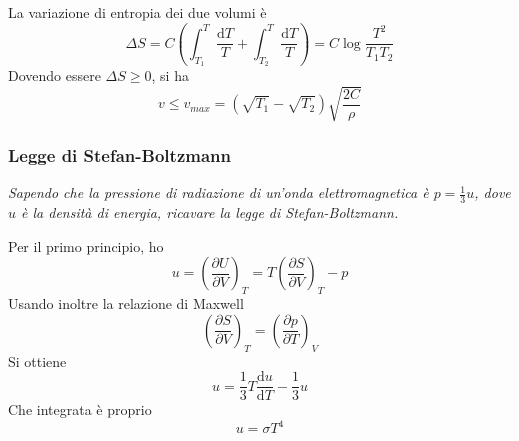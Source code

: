 \documentclass[a4paper,11pt]{article}
\begin{document}
La variazione di entropia dei due volumi è
\[\Delta S=C\left(\int_{T_1}^{T}\frac{\mathrm{d}T}{T}+\int_{T_2}^{T}\frac{\mathrm{d}T}{T}\right)=C\log\frac{T^2}{T_1T_2}\]
Dovendo essere $\Delta S\geq0$, si ha
\[v\leq v_{max}=\left(\sqrt{T_1}-\sqrt{T_2}\right)\sqrt{\frac{2C}{\rho}}\]
\subsubsection{Legge di Stefan-Boltzmann}
\textit{Sapendo che la pressione di radiazione di un'onda elettromagnetica è $p=\frac{1}{3}u$, dove $u$ è la densità di energia, ricavare la legge di Stefan-Boltzmann.}

\noindent Per il primo principio, ho
\[u=\left(\frac{\partial U}{\partial V}\right)_T=T\left(\frac{\partial S}{\partial V}\right)_T-p\]
Usando inoltre la relazione di Maxwell
\[\left(\frac{\partial S}{\partial V}\right)_T=\left(\frac{\partial p}{\partial T}\right)_V\]
Si ottiene
\[u=\frac{1}{3}T\frac{\mathrm{d}u}{\mathrm{d}T}-\frac{1}{3}u\]
Che integrata è proprio
\[u=\sigma T^4\]
\end{document}
